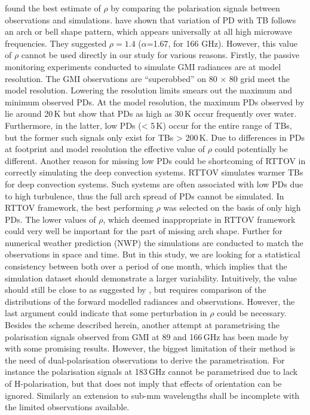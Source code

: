 \documentclass[amt, manuscript]{copernicus}
\begin{document}
\citep{barlakas:intro:21} found the best estimate of $\rho$ by comparing the polarisation signals between observations and simulations. \citet{gong:micro:17} have shown that variation of PD with TB follows an arch or bell shape pattern, which appears universally at all high microwave frequencies.  They suggested $\rho = 1.4$ ($\alpha$=1.67, for 166\,\,GHz). However, this value of $\rho$ cannot be used directly in our study for various reasons. Firstly, the passive monitoring experiments conducted to simulate GMI radiances are at model resolution. The GMI observations are ``superobbed'' on 80 $\times$ 80 grid meet the model resolution. Lowering the resolution limits smears out the maximum and minimum observed PDs. At the model resolution, the maximum PDs observed by \citet{barlakas:intro:21} lie around 20\,K but \citet{gong:micro:17} show that PDs as high as 30\,K occur frequently over water. Furthermore, in the latter, low PDs (< 5\,K) occur for the entire range of TBs, but the former such signals only exist for TBs > 200\,K. Due to differences in PDs at footprint and model resolution the effective value of $\rho$ could potentially be different. Another reason for missing low PDs could be shortcoming of RTTOV in correctly simulating the deep convection systems. RTTOV simulates warmer TBs for deep convection systems. Such systems are often associated with low PDs due to high turbulence, thus the full arch spread of PDs cannot be simulated. In RTTOV framework, the best performing $\rho$ was selected on the basis of only high PDs. The lower values of $\rho$, which deemed inappropriate in RTTOV framework could very well be important for the part of missing arch shape. Further for numerical weather prediction (NWP) the simulations are conducted to match the observations in space and time. But in this study, we are looking for a statistical consistency between both over a period of one month, which implies that the simulation dataset should demonstrate a larger variability.  Intuitively, the value should still be close to as suggested by \citet{barlakas:intro:21}, but requires comparison of the distributions of the forward modelled radiances and observations. However, the last argument could  indicate that some perturbation in $\rho$ could be necessary.
Besides the scheme described herein, another attempt at parametrising the polarisation signals observed from GMI at 89 and 166\,GHz has been made by \citet{galligani:param:21} with some promising results. However, the biggest limitation of their method is the need of dual-polarisation observations to derive the parametrisation. For instance the polarisation signals at 183\,GHz cannot be parametrised due to lack of H-polarisation, but that does not imply that effects of orientation can be ignored. Similarly an extension to sub-mm wavelengths shall be incomplete with the limited observations available.  
\end{document}
